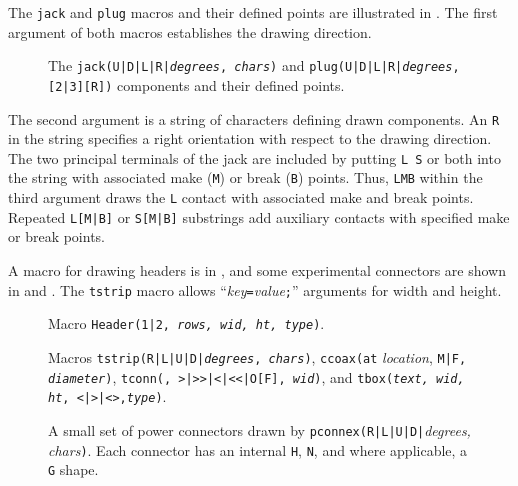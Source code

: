 The {\tt jack} and {\tt plug} macros and their defined points are
illustrated in .
The first argument of both macros establishes the drawing direction.
\begin{figure}[h!]
   
   \vspace{-1ex}
   \caption{The {\tt jack(U|D|L|R|{\sl degrees}, {\sl chars})}
    and {\tt plug(U|D|L|R|{\sl degrees},[2|3][R])} components
    and their defined points.}
   \label{Jack}
   \end{figure}
 The second argument is a string of characters defining drawn components.
 An {\tt R} in the string specifies a
 right orientation with respect to the drawing direction.
 The two principal terminals of
 the jack are included by putting \hbox{{\tt L} {\tt S}}
 or both into the string with associated make ({\tt M})
 or break ({\tt B}) points.  Thus, {\tt LMB} within the third
 argument draws the {\tt L} contact with
 associated make and break points. Repeated {\tt L[M|B]}
 or {\tt S[M|B]} substrings add auxiliary contacts with 
 specified make or break points.

A macro for drawing headers is in ,
and some experimental connectors are shown in  and .
The {\tt tstrip} macro allows ``{\sl key}{\tt =}{\sl value}{\tt ;}'' arguments
for width and height.
\begin{figure}[ht]
   
   \caption{Macro {\tt Header(1|2, {\sl rows, wid, ht, type})}.}
   \label{Headers}
   \end{figure}
\begin{figure}[ht]
   
   \caption{Macros {\tt tstrip(R|L|U|D|{\sl degrees}, {\sl chars})},
     {\tt ccoax(at} {\sl location}, {\tt M|F, {\sl diameter})},
     {\tt tconn(\linespec, >|>>|<|<<|O[F], {\sl wid})}, and
     {\tt tbox({\sl text, wid, ht}, <|>|<>,{\sl type})}. }
   \label{Conn}
   \end{figure}
\begin{figure}[ht]
   
   \caption{A small set of power connectors drawn by
    {\tt pconnex(R|L|U|D|}{\sl degrees, chars}{\tt)}. Each connector has
    an internal {\tt H}, {\tt N}, and where applicable, a {\tt G} shape.}
   \label{Pconn}
   \end{figure}


